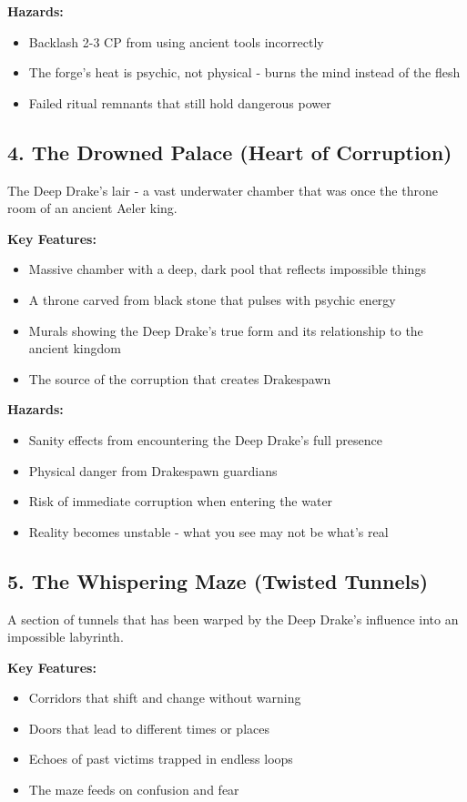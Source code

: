 \documentclass[11pt]{article}
\begin{document}
\textbf{Hazards:}
\begin{itemize}
\item Backlash 2-3 CP from using ancient tools incorrectly
\item The forge's heat is psychic, not physical - burns the mind instead of the flesh
\item Failed ritual remnants that still hold dangerous power
\end{itemize}

\subsection{4. The Drowned Palace (Heart of Corruption)}

The Deep Drake's lair - a vast underwater chamber that was once the throne room of an ancient Aeler king.

\textbf{Key Features:}
\begin{itemize}
\item Massive chamber with a deep, dark pool that reflects impossible things
\item A throne carved from black stone that pulses with psychic energy
\item Murals showing the Deep Drake's true form and its relationship to the ancient kingdom
\item The source of the corruption that creates Drakespawn
\end{itemize}

\textbf{Hazards:}
\begin{itemize}
\item Sanity effects from encountering the Deep Drake's full presence
\item Physical danger from Drakespawn guardians
\item Risk of immediate corruption when entering the water
\item Reality becomes unstable - what you see may not be what's real
\end{itemize}

\subsection{5. The Whispering Maze (Twisted Tunnels)}

A section of tunnels that has been warped by the Deep Drake's influence into an impossible labyrinth.

\textbf{Key Features:}
\begin{itemize}
\item Corridors that shift and change without warning
\item Doors that lead to different times or places
\item Echoes of past victims trapped in endless loops
\item The maze feeds on confusion and fear
\end{itemize}
\end{document}
